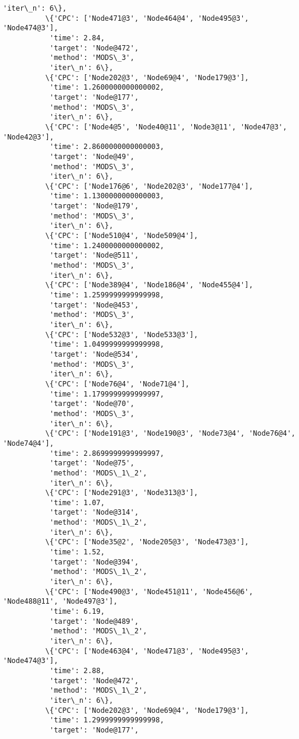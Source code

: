 \documentclass[11pt]{article}
\begin{document}
\begin{Verbatim}[commandchars=\\\{\}]
           'iter\_n': 6\},
          \{'CPC': ['Node471@3', 'Node464@4', 'Node495@3', 'Node474@3'],
           'time': 2.84,
           'target': 'Node@472',
           'method': 'MODS\_3',
           'iter\_n': 6\},
          \{'CPC': ['Node202@3', 'Node69@4', 'Node179@3'],
           'time': 1.2600000000000002,
           'target': 'Node@177',
           'method': 'MODS\_3',
           'iter\_n': 6\},
          \{'CPC': ['Node4@5', 'Node40@11', 'Node3@11', 'Node47@3', 'Node42@3'],
           'time': 2.8600000000000003,
           'target': 'Node@49',
           'method': 'MODS\_3',
           'iter\_n': 6\},
          \{'CPC': ['Node176@6', 'Node202@3', 'Node177@4'],
           'time': 1.1300000000000003,
           'target': 'Node@179',
           'method': 'MODS\_3',
           'iter\_n': 6\},
          \{'CPC': ['Node510@4', 'Node509@4'],
           'time': 1.2400000000000002,
           'target': 'Node@511',
           'method': 'MODS\_3',
           'iter\_n': 6\},
          \{'CPC': ['Node389@4', 'Node186@4', 'Node455@4'],
           'time': 1.2599999999999998,
           'target': 'Node@453',
           'method': 'MODS\_3',
           'iter\_n': 6\},
          \{'CPC': ['Node532@3', 'Node533@3'],
           'time': 1.0499999999999998,
           'target': 'Node@534',
           'method': 'MODS\_3',
           'iter\_n': 6\},
          \{'CPC': ['Node76@4', 'Node71@4'],
           'time': 1.1799999999999997,
           'target': 'Node@70',
           'method': 'MODS\_3',
           'iter\_n': 6\},
          \{'CPC': ['Node191@3', 'Node190@3', 'Node73@4', 'Node76@4', 'Node74@4'],
           'time': 2.8699999999999997,
           'target': 'Node@75',
           'method': 'MODS\_1\_2',
           'iter\_n': 6\},
          \{'CPC': ['Node291@3', 'Node313@3'],
           'time': 1.07,
           'target': 'Node@314',
           'method': 'MODS\_1\_2',
           'iter\_n': 6\},
          \{'CPC': ['Node35@2', 'Node205@3', 'Node473@3'],
           'time': 1.52,
           'target': 'Node@394',
           'method': 'MODS\_1\_2',
           'iter\_n': 6\},
          \{'CPC': ['Node490@3', 'Node451@11', 'Node456@6', 'Node488@11', 'Node497@3'],
           'time': 6.19,
           'target': 'Node@489',
           'method': 'MODS\_1\_2',
           'iter\_n': 6\},
          \{'CPC': ['Node463@4', 'Node471@3', 'Node495@3', 'Node474@3'],
           'time': 2.88,
           'target': 'Node@472',
           'method': 'MODS\_1\_2',
           'iter\_n': 6\},
          \{'CPC': ['Node202@3', 'Node69@4', 'Node179@3'],
           'time': 1.2999999999999998,
           'target': 'Node@177',

\end{Verbatim}
\end{document}
